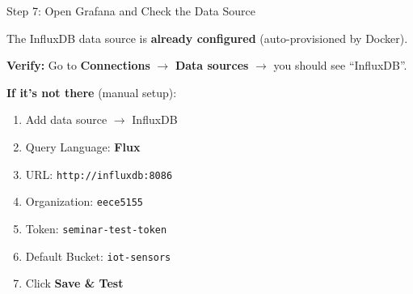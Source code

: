 \documentclass[aspectratio=169,11pt]{beamer}
\begin{document}
\begin{frame}[fragile]{Step 7: Open Grafana and Check the Data Source}

    \vspace{0.3cm}
    The InfluxDB data source is \textbf{already configured} (auto-provisioned by Docker).

    \vspace{0.2cm}
    \textbf{Verify:} Go to \textbf{Connections} $\rightarrow$ \textbf{Data sources} $\rightarrow$ you should see ``InfluxDB''.

    \vspace{0.3cm}
    \textbf{If it's not there} (manual setup):
    \begin{enumerate}
        \item Add data source $\rightarrow$ InfluxDB
        \item Query Language: \textbf{Flux}
        \item URL: \texttt{http://influxdb:8086}
        \item Organization: \texttt{eece5155}
        \item Token: \texttt{seminar-test-token}
        \item Default Bucket: \texttt{iot-sensors}
        \item Click \textbf{Save \& Test}
    \end{enumerate}
\end{frame}
\end{document}
